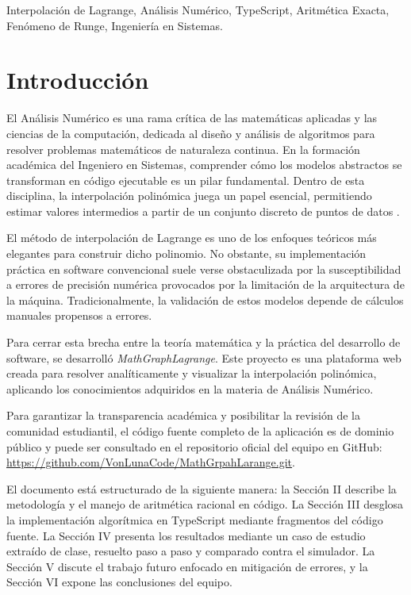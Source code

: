 \documentclass[conference]{IEEEtran}
\begin{document}
\begin{IEEEkeywords}
Interpolación de Lagrange, Análisis Numérico, TypeScript, Aritmética Exacta, Fenómeno de Runge, Ingeniería en Sistemas.
\end{IEEEkeywords}

\section{Introducción}
El Análisis Numérico es una rama crítica de las matemáticas aplicadas y las ciencias de la computación, dedicada al diseño y análisis de algoritmos para resolver problemas matemáticos de naturaleza continua. En la formación académica del Ingeniero en Sistemas, comprender cómo los modelos abstractos se transforman en código ejecutable es un pilar fundamental. Dentro de esta disciplina, la interpolación polinómica juega un papel esencial, permitiendo estimar valores intermedios a partir de un conjunto discreto de puntos de datos \cite{b1}.

\vspace{0.2cm}

El método de interpolación de Lagrange es uno de los enfoques teóricos más elegantes para construir dicho polinomio. No obstante, su implementación práctica en software convencional suele verse obstaculizada por la susceptibilidad a errores de precisión numérica provocados por la limitación de la arquitectura de la máquina. Tradicionalmente, la validación de estos modelos depende de cálculos manuales propensos a errores.

\vspace{0.2cm}

Para cerrar esta brecha entre la teoría matemática y la práctica del desarrollo de software, se desarrolló \textit{MathGraphLagrange}. Este proyecto es una plataforma web creada para resolver analíticamente y visualizar la interpolación polinómica, aplicando los conocimientos adquiridos en la materia de Análisis Numérico. 

Para garantizar la transparencia académica y posibilitar la revisión de la comunidad estudiantil, el código fuente completo de la aplicación es de dominio público y puede ser consultado en el repositorio oficial del equipo en GitHub: \url{https://github.com/VonLunaCode/MathGrpahLarange.git}.

El documento está estructurado de la siguiente manera: la Sección II describe la metodología y el manejo de aritmética racional en código. La Sección III desglosa la implementación algorítmica en TypeScript mediante fragmentos del código fuente. La Sección IV presenta los resultados mediante un caso de estudio extraído de clase, resuelto paso a paso y comparado contra el simulador. La Sección V discute el trabajo futuro enfocado en mitigación de errores, y la Sección VI expone las conclusiones del equipo.
\end{document}
